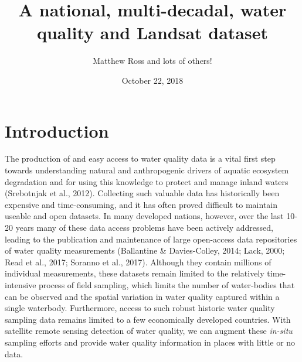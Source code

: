 \documentclass[]{article}
\title{A national, multi-decadal, water quality and Landsat dataset}
\author{Matthew Ross and lots of others!}
\date{October 22, 2018}
\begin{document}
\maketitle

{
\setcounter{tocdepth}{2}
\tableofcontents
}
\hypertarget{introduction}{%
\section{Introduction}\label{introduction}}

The production of and easy access to water quality data is a vital first
step towards understanding natural and anthropogenic drivers of aquatic
ecosystem degradation and for using this knowledge to protect and manage
inland waters (Srebotnjak et al., 2012). Collecting such valuable data
has historically been expensive and time-consuming, and it has often
proved difficult to maintain useable and open datasets. In many
developed nations, however, over the last 10-20 years many of these data
access problems have been actively addressed, leading to the publication
and maintenance of large open-access data repositories of water quality
measurements (Ballantine \& Davies-Colley, 2014; Lack, 2000; Read et
al., 2017; Soranno et al., 2017). Although they contain millions of
individual measurements, these datasets remain limited to the relatively
time-intensive process of field sampling, which limits the number of
water-bodies that can be observed and the spatial variation in water
quality captured within a single waterbody. Furthermore, access to such
robust historic water quality sampling data remains limited to a few
economically developed countries. With satellite remote sensing
detection of water quality, we can augment these \emph{in-situ} sampling
efforts and provide water quality information in places with little or
no data.
\end{document}
